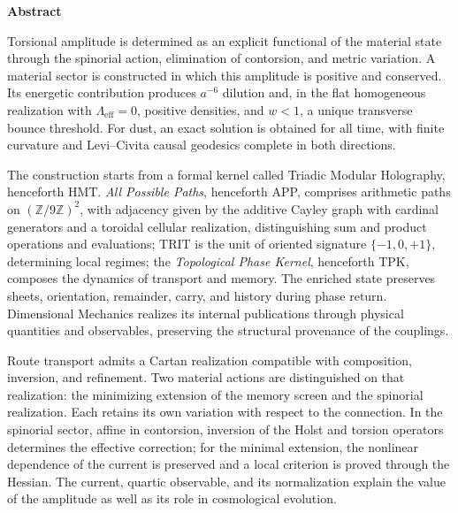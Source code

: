 
\begin{center}\bfseries Abstract\end{center}
\begingroup
\fontsize{10.5}{12.8}\selectfont
\setlength{\parskip}{2pt plus 1pt minus .5pt}
\noindent
Torsional amplitude is determined as an explicit functional of the
material state through the spinorial action, elimination of contorsion,
and metric variation. A material sector is constructed in which this
amplitude is positive and conserved. Its energetic contribution produces
\(a^{-6}\) dilution and, in the flat homogeneous realization with
\(\Lambda_{\mathrm{eff}}=0\), positive densities, and \(w<1\), a unique
transverse bounce threshold. For dust, an exact solution is obtained for
all time, with finite curvature and Levi--Civita causal geodesics complete
in both directions.

The construction starts from a formal kernel called Triadic Modular
Holography, henceforth HMT. \emph{All Possible Paths}, henceforth APP,
comprises arithmetic paths on \((\mathbb Z/9\mathbb Z)^2\), with
adjacency given by the additive Cayley graph with cardinal generators
and a toroidal cellular realization, distinguishing sum and product
operations and evaluations; TRIT is the unit
of oriented signature \(\{-1,0,+1\}\), determining local regimes; the
\emph{Topological Phase Kernel}, henceforth TPK, composes the dynamics of
transport and memory. The enriched state preserves sheets, orientation,
remainder, carry, and history during phase return. Dimensional Mechanics
realizes its internal publications through physical quantities and
observables, preserving the structural provenance of the couplings.

Route transport admits a Cartan realization compatible with composition,
inversion, and refinement. Two material actions are distinguished on that
realization: the minimizing extension of the memory screen and the
spinorial realization. Each retains its own variation with respect to
the connection. In the spinorial sector, affine in contorsion, inversion
of the Holst and torsion operators determines the effective correction;
for the minimal extension, the nonlinear dependence of the current is
preserved and a local criterion is proved through the Hessian. The
current, quartic observable, and its normalization explain the value of
the amplitude as well as its role in cosmological evolution.


